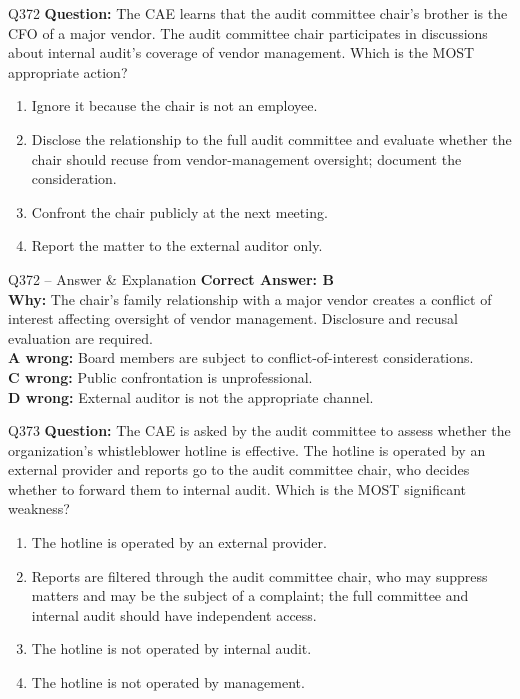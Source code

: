 \documentclass[aspectratio=169,10pt]{beamer}
\begin{document}
	\begin{frame}[t]{Q372}
		\small
		\textbf{Question:} The CAE learns that the audit committee chair's brother is the CFO of a major vendor. The audit committee chair participates in discussions about internal audit's coverage of vendor management. Which is the MOST appropriate action?
		\begin{enumerate}[label=\Alph*.,itemsep=1pt,topsep=2pt]
			\item Ignore it because the chair is not an employee.
			\item Disclose the relationship to the full audit committee and evaluate whether the chair should recuse from vendor-management oversight; document the consideration.
			\item Confront the chair publicly at the next meeting.
			\item Report the matter to the external auditor only.
		\end{enumerate}
	\end{frame}
	
	\begin{frame}[t]{Q372 -- Answer \& Explanation}
		\small
		\textbf{Correct Answer: B} \\[4pt]
		\textbf{Why:} The chair's family relationship with a major vendor creates a conflict of interest affecting oversight of vendor management. Disclosure and recusal evaluation are required. \\[4pt]
		\textbf{A wrong:} Board members are subject to conflict-of-interest considerations. \\[2pt]
		\textbf{C wrong:} Public confrontation is unprofessional. \\[2pt]
		\textbf{D wrong:} External auditor is not the appropriate channel.
	\end{frame}
	
	\begin{frame}[t]{Q373}
		\small
		\textbf{Question:} The CAE is asked by the audit committee to assess whether the organization's whistleblower hotline is effective. The hotline is operated by an external provider and reports go to the audit committee chair, who decides whether to forward them to internal audit. Which is the MOST significant weakness?
		\begin{enumerate}[label=\Alph*.,itemsep=1pt,topsep=2pt]
			\item The hotline is operated by an external provider.
			\item Reports are filtered through the audit committee chair, who may suppress matters and may be the subject of a complaint; the full committee and internal audit should have independent access.
			\item The hotline is not operated by internal audit.
			\item The hotline is not operated by management.
		\end{enumerate}
	\end{frame}
	
\end{document}
